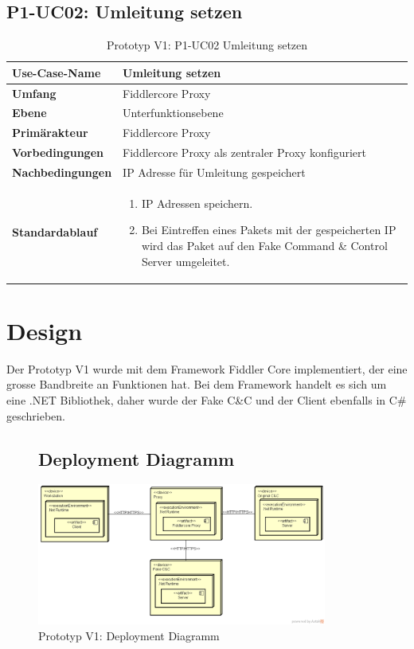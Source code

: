\begin{table}[H]
	\subsection{P1-UC02: Umleitung setzen}
    \centering
    \begin{tabularx}{\textwidth}{| l | p{} |}
        \hline
        \textbf{Use-Case-Name}     & \textbf{Umleitung setzen}    \\ \hline
        \textbf{Umfang}  & Fiddlercore Proxy     \\ \hline
        \textbf{Ebene} & Unterfunktionsebene   \\ \hline
        \textbf{Primärakteur} & Fiddlercore Proxy \\ \hline
        \textbf{Vorbedingungen} & Fiddlercore Proxy als zentraler Proxy konfiguriert \\ \hline
        \textbf{Nachbedingungen} & IP Adresse für Umleitung gespeichert \\ \hline
        \textbf{Standardablauf} & \begin{enumerate}
        	\item IP Adressen speichern.
        	\item Bei Eintreffen eines Pakets mit der gespeicherten IP wird das Paket auf den Fake Command \& Control Server umgeleitet.
        \end{enumerate} \\ \hline
    \end{tabularx}
    \caption{Prototyp V1: P1-UC02 Umleitung setzen}
\end{table}

\section{Design}
Der Prototyp V1 wurde mit dem Framework Fiddler Core\cite{fiddler:doku} \cite{ fiddler:book} \cite{fiddler:apidoku} implementiert, der eine grosse Bandbreite an Funktionen hat.
Bei dem Framework handelt es sich um eine .NET Bibliothek, daher wurde der Fake C\&C und der Client ebenfalls in C\#\cite{msdn} geschrieben.

\begin{figure}[H]
	\subsection{Deployment Diagramm}
	\centering
	\includegraphics[width=0.85\textwidth]{img/PrototypeV1.png}
	\caption{Prototyp V1: Deployment Diagramm}
	\label{fig:deployment-Diagramm-prototyp-v1}
\end{figure}


